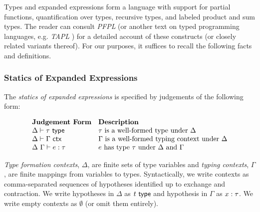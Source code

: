 Types and expanded expressions form a language with support for partial functions, quantification over types, recursive types, and labeled product and sum types. The reader can consult \emph{PFPL} \cite{pfpl} (or another text on typed programming languages, e.g. \emph{TAPL} \cite{tapl}) for a detailed account of these constructs (or closely related variants thereof). For our purposes, it suffices to recall the following facts and definitions.

\subsubsection{Statics of Expanded Expressions}
The \emph{statics of expanded expressions} is specified by judgements of the following form:

\[\begin{array}{ll}
\textbf{Judgement Form} & \textbf{Description}\\
\Delta \vdash \tau~\mathsf{type} & \text{$\tau$ is a well-formed type under $\Delta$}\\
\Delta \vdash \Gamma~\mathsf{ctx} & \text{$\Gamma$ is a well-formed typing context under $\Delta$}\\
\Delta~\Gamma \vdash e : \tau & \text{$e$ has type $\tau$ under $\Delta$ and $\Gamma$}
\end{array}\]

\emph{Type formation contexts}, $\Delta$, are finite sets of type variables and \emph{typing contexts}, $\Gamma$, are finite mappings from variables to types. Syntactically, we write contexts as comma-separated sequences of {hypotheses} identified up to exchange and contraction. We write hypotheses in $\Delta$ as $t~\mathsf{type}$ and hypothesis in $\Gamma$ as $x : \tau$. We write empty contexts as $\emptyset$ (or omit them entirely). 


